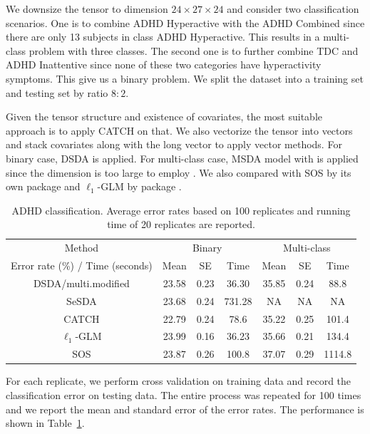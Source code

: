  We downsize the tensor to dimension $24\times 27\times 24$ and consider two classification scenarios. One is to combine ADHD Hyperactive with the ADHD Combined since there are only 13 subjects in class ADHD Hyperactive. This results in a multi-class problem with three classes. The second one is to further combine TDC and ADHD Inattentive since none of these two categories have hyperactivity symptoms. This give us a binary problem. We split the dataset into a training set and testing set by ratio $8:2$.
 
 Given the tensor structure and existence of covariates, the most suitable approach is to apply CATCH on that. We also vectorize the tensor into vectors and stack covariates along with the long vector to apply vector methods. For binary case, DSDA is applied. For multi-class case, MSDA model with  is applied since the dimension is too large to employ . We also compared with SOS \citep{Clemmensen} by its own package  and $\ell_1$-GLM \citep{glmnet} by package . 
 
 
 \begin{table}[!t]
  \centering
  \begin{tabular}{ccccccc}
   \toprule
   Method&\multicolumn{3}{c}{Binary}&\multicolumn{3}{c}{Multi-class}\\
   Error rate (\%) / Time (seconds)&Mean&SE&Time&Mean&SE&Time\\
   \midrule
   DSDA/multi.modified&23.58&0.23&36.30&35.85&0.24&88.8\\
   SeSDA&23.68&0.24&731.28&NA&NA&NA\\
   CATCH&22.79&0.24&78.6&35.22&0.25&101.4\\
   $\ell_1$-GLM&23.99&0.16&36.23&35.66&0.21&134.4\\
   SOS&23.87&0.26&100.8&37.07&0.29&1114.8\\
   \bottomrule
  \end{tabular}
  \caption{ADHD classification. Average error rates based on 100 replicates and running time of 20 replicates are reported.}
  \label{tab: adhd}
 \end{table}
 
 For each replicate, we perform cross validation on training data and record the classification error on testing data. The entire process was repeated for 100 times and we report the mean and standard error of the error rates. The performance is shown in Table~\ref{tab: adhd}.
 
 
 
